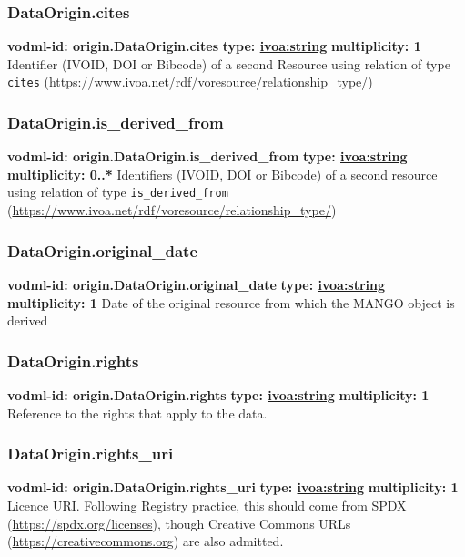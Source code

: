     \subsubsection{DataOrigin.cites}
      \textbf{vodml-id: origin.DataOrigin.cites} \newline
      \textbf{type: \hyperref[sect:ivoa]{ivoa:string}} \newline
      \textbf{multiplicity: 1} \newline
      Identifier (IVOID, DOI or Bibcode) of a second Resource using relation of type \texttt{cites} (\url{https://www.ivoa.net/rdf/voresource/relationship\_type/})

    \subsubsection{DataOrigin.is\_derived\_from}
      \textbf{vodml-id: origin.DataOrigin.is\_derived\_from} \newline
      \textbf{type: \hyperref[sect:ivoa]{ivoa:string}} \newline
      \textbf{multiplicity: 0..*} \newline
      Identifiers (IVOID, DOI or Bibcode) of a second resource using relation of type \texttt{is\_derived\_from} (\url{https://www.ivoa.net/rdf/voresource/relationship\_type/})

    \subsubsection{DataOrigin.original\_date}
      \textbf{vodml-id: origin.DataOrigin.original\_date} \newline
      \textbf{type: \hyperref[sect:ivoa]{ivoa:string}} \newline
      \textbf{multiplicity: 1} \newline
      Date of the original resource from which the MANGO object is derived

    \subsubsection{DataOrigin.rights}
      \textbf{vodml-id: origin.DataOrigin.rights} \newline
      \textbf{type: \hyperref[sect:ivoa]{ivoa:string}} \newline
      \textbf{multiplicity: 1} \newline
      Reference to the rights that apply to the data.

    \subsubsection{DataOrigin.rights\_uri}
      \textbf{vodml-id: origin.DataOrigin.rights\_uri} \newline
      \textbf{type: \hyperref[sect:ivoa]{ivoa:string}} \newline
      \textbf{multiplicity: 1} \newline
      Licence URI. Following Registry practice, this should come from SPDX (\url{https://spdx.org/licenses}), though Creative Commons URLs (\url{https://creativecommons.org}) are also admitted.

